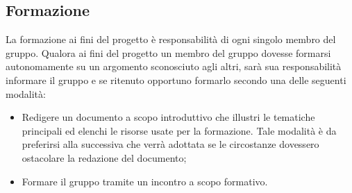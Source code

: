 \subsection{Formazione}
La formazione ai fini del progetto è responsabilità di ogni singolo membro del gruppo. Qualora ai fini del progetto un membro del gruppo dovesse formarsi autonomamente su un argomento sconosciuto agli altri, sarà sua responsabilità informare il gruppo e se ritenuto opportuno formarlo secondo una delle seguenti modalità:
\begin{itemize}
	\item Redigere un documento a scopo introduttivo che illustri le tematiche principali ed
	elenchi le risorse usate per la formazione. Tale modalità è da preferirsi alla successiva che verrà adottata se le circostanze dovessero ostacolare la redazione del documento;
	\item Formare il gruppo tramite un incontro a scopo formativo.
\end{itemize}

\pagebreak

